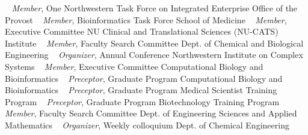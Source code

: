 ~
\Gap
{}
\textit{Member},
    One Northwestern Task Force on Integrated Enterprise
    \newline
Office of the Provost
\newline
~
\Gap
{}
\textit{Member},
    Bioinformatics Task Force
    \newline
School of Medicine
\newline
~
\Gap
{}
\textit{Member},
    Executive Committee
    \newline
NU Clinical and Translational Sciences (NU-CATS) Institute
\newline
~
\Gap
{}
\textit{Member},
    Faculty Search Committee
    \newline
Dept. of Chemical and Biological Engineering
\newline
~
\Gap
{}
\textit{Organizer},
    Annual Conference
    \newline
Northwestern Institute on Complex Systems
\newline
~
\Gap
{}
\textit{Member},
    Executive Committee
    \newline
Computational Biology and Bioinformatics
\newline
~
\Gap
{}
\textit{Preceptor},
    Graduate Program
    \newline
Computational Biology and Bioinformatics
\newline
~
\Gap
{}
\textit{Preceptor},
    Graduate Program
    \newline
Medical Scientist Training Program
\newline
~
\Gap
{}
\textit{Preceptor},
    Graduate Program
    \newline
Biotechnology Training Program
\newline
~
\Gap
{}
\textit{Member},
    Faculty Search Committee
    \newline
Dept. of Engineering Sciences and Applied Mathematics 
\newline
~
\Gap
{}
\textit{Organizer},
    Weekly colloquium
    \newline
Dept. of Chemical Engineering
\newline
